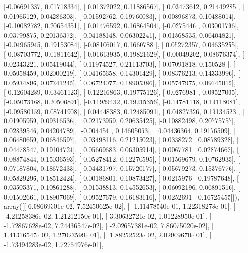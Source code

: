 \documentclass{article}
\begin{document}
       [-0.06691337,  0.01718334],
       [ 0.01372022,  0.11886567],
       [ 0.03473612,  0.21449285],
       [ 0.01965129,  0.04286303],
       [ 0.01592762,  0.19760083],
       [ 0.00896873,  0.10488014],
       [-0.10082782,  0.20654351],
       [ 0.01476592,  0.16864504],
       [-0.0275446 ,  0.03001796],
       [ 0.03799875,  0.20136372],
       [ 0.04188148,  0.06302241],
       [ 0.01868535,  0.06404821],
       [-0.04965945,  0.19153084],
       [-0.08106017,  0.1660788 ],
       [ 0.05272357,  0.04635255],
       [-0.08703772,  0.01811642],
       [ 0.01613935,  0.19821629],
       [-0.00049202,  0.08676374],
       [ 0.02343221,  0.05419044],
       [-0.11974527,  0.21113703],
       [ 0.07091818,  0.150528  ],
       [ 0.05058459,  0.02000219],
       [ 0.04165658,  0.14301429],
       [-0.08376213,  0.14333996],
       [ 0.05934896,  0.07341245],
       [ 0.06724077,  0.18905386],
       [-0.05747975,  0.09145015],
       [-0.12604289,  0.03461123],
       [-0.12216863,  0.19775126],
       [ 0.0276981 ,  0.09527005],
       [-0.05073168,  0.20506891],
       [-0.11959432,  0.19215356],
       [-0.14781118,  0.19118081],
       [-0.09580159,  0.08741908],
       [ 0.04448383,  0.12485091],
       [ 0.04827326,  0.19134523],
       [ 0.01905959,  0.09316536],
       [ 0.02173959,  0.20635425],
       [-0.10882498,  0.20775757],
       [ 0.02839546,  0.04204789],
       [-0.004454  ,  0.14605063],
       [ 0.04436364,  0.19176509],
       [ 0.06480659,  0.06846597],
       [ 0.03498116,  0.21215023],
       [ 0.0338272 ,  0.08789328],
       [ 0.04478547,  0.19104724],
       [ 0.05669683,  0.06305914],
       [ 0.0067781 ,  0.02874663],
       [ 0.08874844,  0.15036593],
       [ 0.05278412,  0.12270595],
       [ 0.01569679,  0.10762935],
       [ 0.07187804,  0.18672433],
       [-0.04431797,  0.15720177],
       [-0.05679273,  0.15376776],
       [ 0.05829296,  0.18512424],
       [ 0.00186801,  0.10873427],
       [-0.0215976 ,  0.19787648],
       [ 0.03505371,  0.10861288],
       [ 0.01538813,  0.14552653],
       [-0.06092196,  0.06891516],
       [ 0.01502661,  0.18907069],
       [-0.09527679,  0.16183116],
       [ 0.0252691 ,  0.16725455]]), array([[  6.08669301e-02,   7.52450625e-02],
       [ -1.11478540e-01,   1.22318278e-01],
       [ -4.21258386e-02,   1.21212150e-01],
       [  3.30632721e-02,   1.01228950e-01],
       [ -1.72867628e-02,   7.24436547e-02],
       [ -2.02657381e-02,   7.86075020e-02],
       [  1.41316547e-02,   1.27023599e-01],
       [ -1.88252523e-02,   2.02909670e-01],
       [ -1.73494283e-02,   1.72764976e-01],
\end{document}
